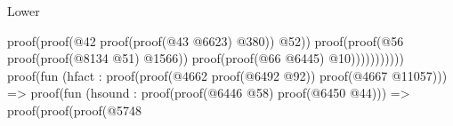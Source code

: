 \begin{lexlean}{Lower}
\begin{coremodule}
                                                                                                                proof(proof(@42
                                                                                                                      proof(proof(@43
                                                                                                                            @6623)
                                                                                                                          @380))
                                                                                                                    @52))
                                                                                                              proof(proof(@56
                                                                                                                    proof(proof(@8134
                                                                                                                          @51)
                                                                                                                        @1566))
                                                                                                                  proof(proof(@66
                                                                                                                        @6445)
                                                                                                                      @10)))))))))))
                                                                                      proof(fun (hfact : proof(proof(@4662
                                                                                              proof(@6492
                                                                                                  @92))
                                                                                            proof(@4667
                                                                                                @11057))) =>
                                                                                        proof(fun (hsound : proof(proof(@6446
                                                                                                @58)
                                                                                              proof(@6450
                                                                                                  @44))) =>
                                                                                          proof(proof(proof(@5748

\end{coremodule}
\end{lexlean}
